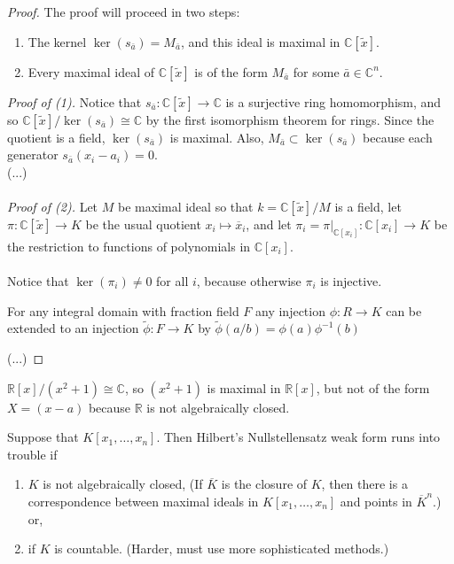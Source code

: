 \documentclass{article}
\newenvironment{example}[1][Example.]{
  \begin{trivlist} \item[\hskip \labelsep {\bfseries #1}]
}{\end{trivlist}}
\newenvironment{note}[1][Note.]{
  \begin{trivlist} \item[\hskip \labelsep {\bfseries #1}]
}{\end{trivlist}}
\newcommand{\fn}[3]{#1 \colon #2 \rightarrow #3}
\newcommand{\inv}[1]{#1^{-1}}
\begin{document}
\begin{proof}
  The proof will proceed in two steps: \begin{enumerate}[(1)]
    \item The kernel $\ker(s_{\bar a}) = M_{\bar a}$, and this ideal is maximal in
    $\mathbb C[\widetilde x]$.
    \item Every maximal ideal of $\mathbb C[\widetilde x]$ is of the form
    $M_{\bar a}$  for some $\bar a \in \mathbb C^n$.
  \end{enumerate}
  \textit{Proof of (1).}
  Notice that $\fn {s_{\bar a}}{\mathbb C[\widetilde x]}{\mathbb C}$ is a
  surjective ring homomorphism, and so
  $\mathbb C[\widetilde x]/\ker(s_{\bar a}) \cong \mathbb C$ by the first
  isomorphism theorem for rings. Since the quotient is
  a field, $\ker(s_{\bar a})$ is maximal.
  Also, $M_{\bar a} \subset \ker(s_{\bar a})$ because each generator
  $s_{\bar a}(x_i - a_i) = 0$.
  \\ (...)
  \\~\\
  \textit{Proof of (2).} Let $M$ be maximal ideal so that
  $k = \mathbb C[\widetilde x]/M$ is a field, let $\fn{\pi}{\mathbb C[\widetilde x]}{K}$
  be the usual quotient $x_i \mapsto \overline x_i$, and let
  $\pi_i = \fn{\pi|_{\mathbb C[x_i]}}{\mathbb C[x_i]}{K}$
  be the restriction to functions of polynomials in $\mathbb C[x_i]$.
  \\~\\
  Notice that $\ker(\pi_i) \neq 0$ for all $i$, because otherwise $\pi_i$ is
  injective.
  \begin{note} %
    For any integral domain with fraction field $F$ any injection $\fn \phi R K$
    can be extended to an injection $\fn {\widetilde\phi} F K$ by
    $\widetilde\phi(a/b) = \phi(a)\inv\phi(b)$
  \end{note}
  (...)
\end{proof}

\begin{example}[Non-example.]
  $\mathbb R[x]/(x^2 + 1) \cong \mathbb C$, so $(x^2 + 1)$ is maximal in
  $\mathbb R[x]$, but not of the form $X=(x - a)$ because $\mathbb R$ is not
  algebraically closed.
\end{example}

\begin{note}
  Suppose that $K[x_1, \hdots, x_n]$. Then Hilbert's Nullstellensatz weak form
  runs into trouble if \begin{enumerate}
    \item $K$ is not algebraically closed, (If $\overline K$ is the closure of
    $K$, then there is a correspondence between maximal ideals in
    $K[x_1, \hdots, x_n]$ and points in $\overline K^n$.) or,
    \item if $K$ is countable. (Harder, must use more sophisticated methods.)
  \end{enumerate}
\end{note}
\end{document}
